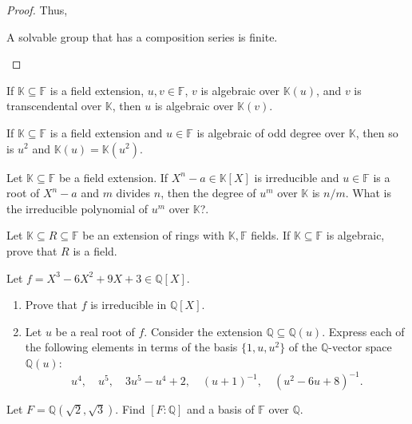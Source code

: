 \documentclass[addpoints,10pt]{exam}
\theoremstyle{plain}
\theoremstyle{definition}
\newtheorem{prob}[thm]{Problem}
\theoremstyle{plain}
\theoremstyle{plain}
\theoremstyle{definition}
\let\oldprob\prob
\let\endoldprob\endprob
\renewenvironment{prob}
  {\begin{singlespace}\oldprob}
  {\endoldprob\end{singlespace}}
\newcommand{\FF}{\ensuremath{\mathbb{F}}}
\newcommand{\KK}{\ensuremath{\mathbb{K}}}
\begin{document}
\begin{proof}
  Thus,
  \begin{center}
    A solvable group that has a composition series is finite.
  \end{center}
\end{proof}
\newpage
\setcounter{thm}{44}   %
\begin{prob}
If $\KK\subseteq \FF$ is a field extension, $u,v\in \FF$, $v$ is algebraic over $\KK(u)$, and $v$ is transcendental over $\KK$, then $u$ is algebraic over $\KK(v)$.
\end{prob}
\newpage
\begin{prob}
If $\KK\subseteq \FF$ is a field extension and $u\in \FF$ is algebraic of odd degree over $\KK$, then so is $u^{2}$ and $\KK(u)=\KK(u^{2})$. 
\end{prob}
\newpage
\begin{prob}
Let $\KK \subseteq \FF$ be a field extension. If $X^n - a \in \KK[X]$ is irreducible and $u \in \FF$ is a root of $X^n - a$ and $m$ divides $n$, then the degree of $u^m$ over $\KK$ is $n/m$. What is the irreducible polynomial of $u^m$ over $\KK$?.
\end{prob}
\newpage
\begin{prob}
Let $\KK \subseteq R \subseteq \FF$ be an extension of rings with $\KK,\FF$ fields. If $\KK \subseteq \FF$ is algebraic, prove that $R$ is a field.
\end{prob}
\newpage
\begin{prob}
Let $f = X^3 - 6X^2 + 9X + 3 \in \mathbb{Q}[X]$.
\begin{enumerate}[label=(\alph*)]
\item Prove that $f$ is irreducible in $\mathbb{Q}[X]$.
\item Let $u$ be a real root of $f$. Consider the extension $\mathbb{Q} \subseteq \mathbb{Q}(u)$. Express each of the following elements in terms of the basis $\{1,u,u^2\}$ of the $\mathbb{Q}$-vector space $\mathbb{Q}(u)$:
\[
u^4,\quad u^5,\quad 3u^5 - u^4 + 2,\quad (u+1)^{-1},\quad (u^2 - 6u + 8)^{-1}.
\]
\end{enumerate}
\end{prob}
\newpage
\begin{prob}
Let $F = \mathbb{Q}(\sqrt{2}, \sqrt{3})$. Find $[F:\mathbb{Q}]$ and a basis of $\FF$ over $\mathbb{Q}$.
\end{prob}
\end{document}
